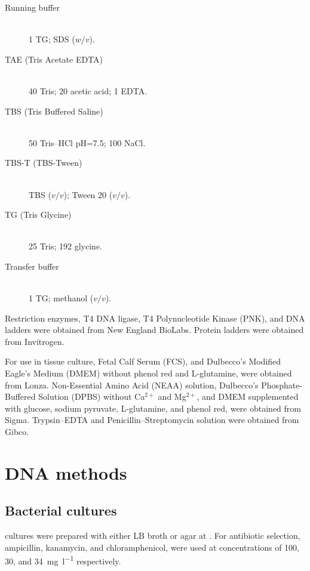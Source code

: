\begin{table}
\begin{description}
    \item[Running buffer] \hfill \\
      \SI{1}{\X}  TG;
       SDS ($w/v$).

    \item[TAE (Tris Acetate EDTA)] \hfill \\
      \SI{40}{\mM} Tris;
      \SI{20}{\mM} acetic acid;
      \SI{1}{\mM}  EDTA.

    \item[TBS (Tris Buffered Saline)] \hfill \\
      \SI{50}{\mM} Tris--HCl pH=\num{7.5};
      \SI{100}{\mM}    NaCl.

    \item[TBS-T (TBS-Tween)] \hfill \\
       TBS ($v/v$);
        Tween 20 ($v/v$).

    \item[TG (Tris Glycine)] \hfill \\
      \SI{25}{\mM}  Tris;
      \SI{192}{\mM} glycine.

    \item[Transfer buffer] \hfill \\
      \SI{1}{\X} TG;
       methanol ($v/v$).
    \end{description}
  \end{table}

  Restriction enzymes, T4 DNA ligase, T4 Polynucleotide Kinase (PNK), and DNA
  ladders were obtained from New England BioLabs.
  Protein ladders were obtained from Invitrogen.

  For use in tissue culture, Fetal Calf Serum (FCS), and
  Dulbecco's Modified Eagle's Medium (DMEM) without phenol red and L-glutamine,
  were obtained from Lonza.  Non-Essential Amino Acid (NEAA) solution,
  Dulbecco's Phosphate-Buffered Solution (DPBS) without Ca$^{2+}$ and Mg$^{2+}$,
  and DMEM supplemented with glucose, sodium pyruvate, L-glutamine,
  and phenol red, were obtained from Sigma.
  Trypsin--EDTA and Penicillin--Streptomycin
  solution were obtained from Gibco.

  \section{DNA methods}
    \subsection{Bacterial cultures}
       cultures were prepared with either LB broth or agar
      at . For antibiotic selection, ampicillin, kanamycin, and
      chloramphenicol, were used at concentrations of 100, 30,
      and \SI{34}{\mg\per\l} respectively.

